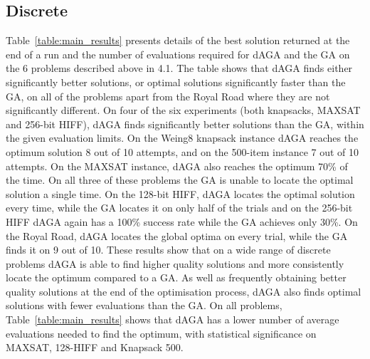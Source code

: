\documentclass[runningheads,a4paper]{llncs}
\begin{document}
\subsection{Discrete}
Table~\ref{table:main_results} presents details of the best solution returned at the end of a run and the number of evaluations required for dAGA and the GA on the 6 problems described above in 4.1. The table shows that dAGA finds either significantly better solutions, or optimal solutions significantly faster than the GA, on all of the problems apart from the Royal Road where they are not significantly different. On four of the six experiments (both knapsacks, MAXSAT and 256-bit HIFF), dAGA finds significantly better solutions than the GA, within the given evaluation limits. On the Weing8 knapsack instance dAGA reaches the optimum solution 8 out of 10 attempts, and on the 500-item instance 7 out of 10 attempts. On the MAXSAT instance, dAGA also reaches the optimum 70\% of the time. On all three of these problems the GA is unable to locate the optimal solution a single time. On the 128-bit HIFF, dAGA locates the optimal solution every time, while the GA locates it on only half of the trials and on the 256-bit HIFF dAGA again has a 100\% success rate while the GA achieves only 30\%. On the Royal Road, dAGA locates the global optima on every trial, while the GA finds it on 9 out of 10. These results show that on a wide range of discrete problems dAGA is able to find higher quality solutions and more consistently locate the optimum compared to a GA. As well as frequently obtaining better quality solutions at the end of the optimisation process, dAGA also finds optimal solutions with fewer evaluations than the GA. On all problems, Table~\ref{table:main_results} shows that dAGA has a lower number of average evaluations needed to find the optimum, with statistical significance on MAXSAT, 128-HIFF and Knapsack 500.
\end{document}
